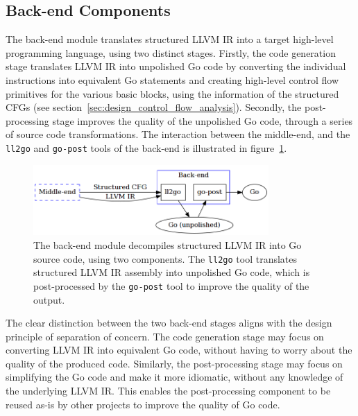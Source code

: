 
\subsection{Back-end Components}
\label{sec:design_back-end_components}

The back-end module translates structured LLVM IR into a target high-level programming language, using two distinct stages. Firstly, the code generation stage translates LLVM IR into unpolished Go code by converting the individual instructions into equivalent Go statements and creating high-level control flow primitives for the various basic blocks, using the information of the structured CFGs (see section~\ref{sec:design_control_flow_analysis}). Secondly, the post-processing stage improves the quality of the unpolished Go code, through a series of source code transformations. The interaction between the middle-end, and the \texttt{ll2go} and \texttt{go-post} tools of the back-end is illustrated in figure~\ref{fig:back-end}.

\begin{figure}[htbp]
	\begin{center}
		\includegraphics[width=0.8\textwidth]{inc/6_design/back-end.png}
		\caption{The back-end module decompiles structured LLVM IR into Go source code, using two components. The \texttt{ll2go} tool translates structured LLVM IR assembly into unpolished Go code, which is post-processed by the \texttt{go-post} tool to improve the quality of the output.}
		\label{fig:back-end}
	\end{center}
\end{figure}

The clear distinction between the two back-end stages aligns with the design principle of separation of concern. The code generation stage may focus on converting LLVM IR into equivalent Go code, without having to worry about the quality of the produced code. Similarly, the post-processing stage may focus on simplifying the Go code and make it more idiomatic, without any knowledge of the underlying LLVM IR. This enables the post-processing component to be reused as-is by other projects to improve the quality of Go code.

